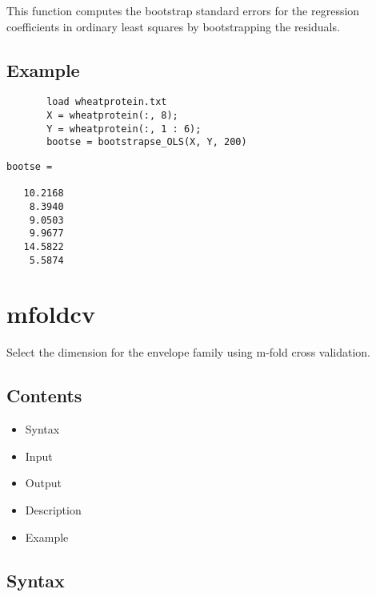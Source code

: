 \documentclass[a4paper,11pt,openany]{memoir}
\begin{document}
\begin{par}
This function computes the bootstrap standard errors for the regression coefficients in ordinary least squares by bootstrapping the residuals.
\end{par} \vspace{1em}


\subsection*{Example}


\begin{verbatim}       load wheatprotein.txt
       X = wheatprotein(:, 8);
       Y = wheatprotein(:, 1 : 6);
       bootse = bootstrapse_OLS(X, Y, 200)\end{verbatim}
    
        \color{lightgray}\ttfamily \begin{verbatim}
bootse =

   10.2168
    8.3940
    9.0503
    9.9677
   14.5822
    5.5874

\end{verbatim} \rmfamily
\color{black}

\newpage

\rmfamily
\color{black}    
\section{mfoldcv}

\begin{par}
Select the dimension for the envelope family using m-fold cross validation.
\end{par} \vspace{1em}

\subsection*{Contents}

\begin{itemize}
\setlength{\itemsep}{-1ex}
   \item Syntax
   \item Input
   \item Output
   \item Description
   \item Example
\end{itemize}


\subsection*{Syntax}
\end{document}
